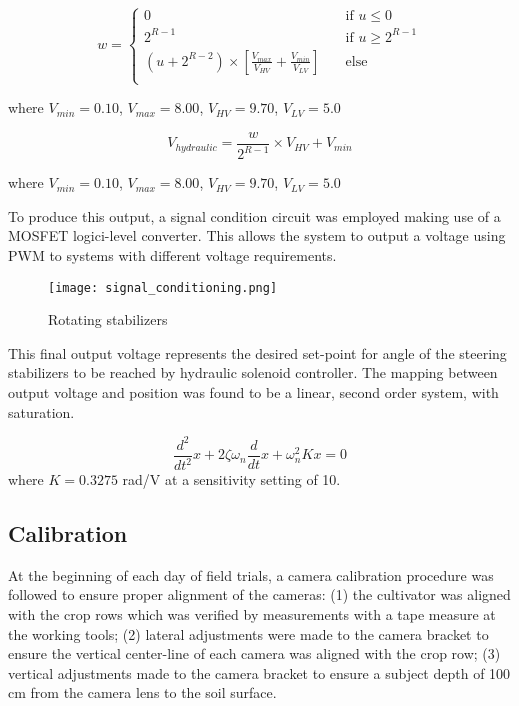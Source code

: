 \begin{equation}
  w = 
  \begin{cases}
    0 & \quad \text{if } u \leq 0 \\
    2^{R-1} & \quad \text{if } u \geq 2^{R-1}\\
    (u +2^{R-2})\times\left[\frac{V_{max}}{V_{HV}}+\frac{V_{min}}{V_{LV}}\right] & \quad \text{else} \\
  \end{cases}
  \label{eq:v_out}
\end{equation}
\begin{flushleft}
where $V_{min}=0.10$, $V_{max}=8.00$, $V_{HV}=9.70$, $V_{LV}=5.0$
\end{flushleft}

\begin{equation}
  V_{hydraulic} = \frac{w}{2^{R-1}} \times V_{HV} + V_{min}
  \label{eq:v_out}
\end{equation}
\begin{flushleft}
where $V_{min}=0.10$, $V_{max}=8.00$, $V_{HV}=9.70$, $V_{LV}=5.0$
\end{flushleft}

To produce this output, a signal condition circuit was employed making
use of a MOSFET logici-level converter. This allows the system to
output a voltage using PWM to systems with different voltage
requirements.

\begin{figure}
  \centering
  \texttt{[image: signal\_conditioning.png]}
  \caption{Rotating stabilizers}
  \label{fig:signal_conditioning}
\end{figure}

This final output voltage represents the desired set-point for angle
of the steering stabilizers to be reached by hydraulic solenoid
controller. The mapping between output voltage and position was found
to be a linear, second order system, with saturation.

\begin{equation}
  \frac{d^2}{dt^2}x + 2\zeta\omega_{n}\frac{d}{dt}x + \omega_{n}^2 Kx = 0 
  \label{eq:v_out}
\end{equation}
where $K=0.3275$ rad/V at a sensitivity setting of 10.

\subsection{Calibration}
At the beginning of each day of field trials, a camera calibration
procedure was followed to ensure proper alignment of the cameras: (1)
the cultivator was aligned with the crop rows which was verified by
measurements with a tape measure at the working tools; (2) lateral
adjustments were made to the camera bracket to ensure the vertical
center-line of each camera was aligned with the crop row; (3) vertical
adjustments made to the camera bracket to ensure a subject depth of
100 cm from the camera lens to the soil surface.

